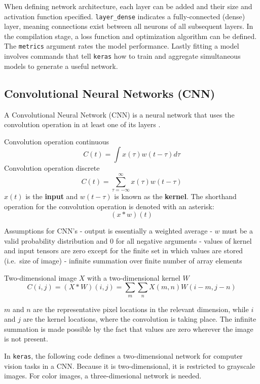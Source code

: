 \documentclass[
]{article}
\begin{document}
When defining network architecture, each layer can be added and their
size and activation function specified. \texttt{layer\_dense} indicates
a fully-connected (dense) layer, meaning connections exist between all
neurons of all subsequent layers. In the compilation stage, a loss
function and optimization algorithm can be defined. The \texttt{metrics}
argument rates the model performance. Lastly fitting a model involves
commands that tell \texttt{keras} how to train and aggregate
simultaneous models to generate a useful network.

\hypertarget{convolutional-neural-networks-cnn}{%
\subsection{Convolutional Neural Networks
(CNN)}\label{convolutional-neural-networks-cnn}}

A Convolutional Neural Network (CNN) is a neural network that uses the
convolution operation in at least one of its layers \cite{?}.

Convolution operation continuous \[
C(t) = \int x(\tau)w(t - \tau)d\tau
\] Convolution operation discrete \[
C(t) = \sum_{\tau = -\infty}^\infty x(\tau)w(t - \tau)
\] \(x(t)\) is the \textbf{input} and \(w(t-\tau)\) is known as the
\textbf{kernel}. The shorthand operation for the convolution operation
is denoted with an asterisk: \[
(x * w)(t)
\]

Assumptions for CNN's \cite{Goodfellow-et-al-2016} - output is
essentially a weighted average - \(w\) must be a valid probability
distribution and 0 for all negative arguments - values of kernel and
input tensors are zero except for the finite set in which values are
stored (i.e.~size of image) - infinite summation over finite number of
array elements

Two-dimensional image \(X\) with a two-dimensional kernel \(W\) \[
C(i,j) = (X * W)(i,j) = \sum_m \sum_n X(m,n)W(i-m,j-n)
\]

\(m\) and \(n\) are the representative pixel locations in the relevant
dimension, while \(i\) and \(j\) are the kernel locations, where the
convolution is taking place. The infinite summation is made possible by
the fact that values are zero wherever the image is not present.

In \texttt{keras}, the following code defines a two-dimensional network
for computer vision tasks in a CNN. Because it is two-dimensional, it is
restricted to grayscale images. For color images, a three-dimesional
network is needed.
\end{document}

